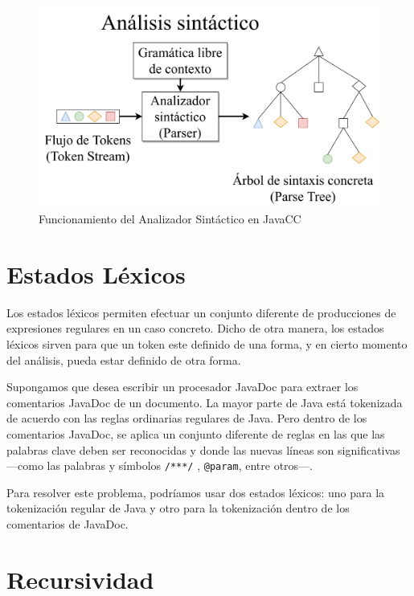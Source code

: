 \begin{figure}[H]
	\centering
	\includegraphics[width=\textwidth]{imagenes/analizadorsintactico.png}
	\caption{\label{fig:analizadorsintactico}Funcionamiento del Analizador Sintáctico en JavaCC\cite{ytanalizadorsintactico}}
\end{figure}



\section{Estados Léxicos}
Los estados léxicos permiten efectuar un conjunto diferente de producciones de expresiones regulares en un caso concreto. Dicho de otra manera, los estados léxicos sirven para que un token este definido de una forma, y en cierto momento del análisis, pueda estar definido de otra forma.

Supongamos que desea escribir un procesador JavaDoc para extraer los comentarios JavaDoc de un documento. La mayor parte de Java está tokenizada de acuerdo con las reglas ordinarias regulares de Java. Pero dentro de los comentarios JavaDoc, se aplica un conjunto diferente de reglas en las que las palabras clave deben ser reconocidas y donde las nuevas líneas son significativas ---como las palabras y símbolos \lstinline|/***/| , \lstinline|@param|, entre otros---.

Para resolver este problema, podríamos usar dos estados léxicos: uno para la tokenización regular de Java y otro para la tokenización dentro de los comentarios de JavaDoc.

\section{Recursividad}

